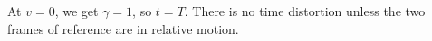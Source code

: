 At $v=0$, we get $\gamma=1$, so $t=T$. There is
no time distortion unless the two frames of reference are in relative motion.



